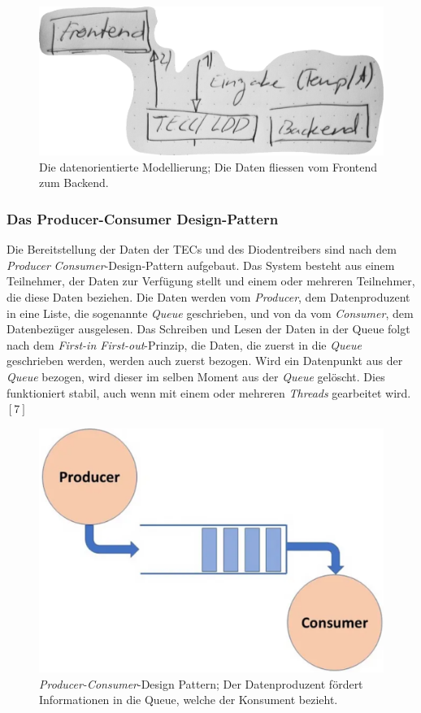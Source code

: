 \begin{figure}
    \centering
    \includegraphics[scale=0.3]{98_images/data_flow_frontend_backend_tec_ldd.PNG}
    \caption{Die datenorientierte Modellierung; Die Daten fliessen vom Frontend zum Backend.}
    \label{fig:dataflow_2}
\end{figure}

\subsubsection{Das Producer-Consumer Design-Pattern}
\label{section:_producer_consumer}
Die Bereitstellung der Daten der TECs und des Diodentreibers sind nach dem \textit{Producer} \textit{Consumer}-Design-Pattern aufgebaut. Das System besteht aus einem Teilnehmer, der Daten zur Verfügung stellt und einem oder mehreren Teilnehmer, die diese Daten beziehen. Die Daten werden vom \textit{Producer}, dem Datenproduzent in eine Liste, die sogenannte \textit{Queue} geschrieben, und von da vom \textit{Consumer}, dem Datenbezüger ausgelesen. Das Schreiben und Lesen der Daten in der Queue folgt nach dem \textit{First-in First-out}-Prinzip, die Daten, die zuerst in die \textit{Queue} geschrieben werden, werden auch zuerst bezogen. Wird ein Datenpunkt aus der \textit{Queue} bezogen, wird dieser im selben Moment aus der \textit{Queue} gelöscht. Dies funktioniert stabil, auch wenn mit einem oder mehreren \textit{Threads} gearbeitet wird. $[7]$

\begin{figure}[H]
    \centering
    \includegraphics[scale=0.3]{98_images/producer_consumer_design_pattern.PNG}
    \caption{\textit{Producer-Consumer}-Design Pattern; Der Datenproduzent fördert Informationen in die Queue, welche der Konsument bezieht.}
    \label{fig:_producer_consumer}
 \end{figure}

